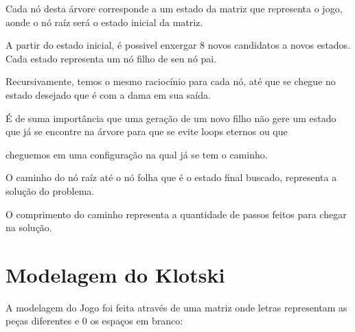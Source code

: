 \documentclass[letterpaper,10pt,openany,oneside,portuges]{sphinxmanual}
\begin{document}
\begin{DUlineblock}{0em}
\item[] 
\end{DUlineblock}
\begin{figure}[htbp]
\centering

\noindent{}
\end{figure}

\begin{DUlineblock}{0em}
\item[] Cada nó desta árvore corresponde a um estado da matriz que representa o jogo, aonde o nó raíz será o estado inicial da matriz.
\item[] A partir do estado inicial, é possivel enxergar 8 novos candidatos a novos estados. Cada estado representa um nó filho de seu nó pai.
\item[] Recursivamente, temos o mesmo raciocínio para cada nó, até que se chegue no estado desejado que é com a dama em sua saída.
\item[] É de suma importância que uma geração de um novo filho não gere um estado que já se encontre na árvore para que se evite loops eternos ou que
\end{DUlineblock}

cheguemos em uma configuração na qual já se tem o caminho.

\begin{DUlineblock}{0em}
\item[] O caminho do nó raíz até o nó folha que é o estado final buscado, representa a solução do problema.
\end{DUlineblock}
\begin{figure}[htbp]
\centering

\noindent{}
\end{figure}

\begin{DUlineblock}{0em}
\item[] O comprimento do caminho representa a quantidade de passos feitos para chegar na solução.
\end{DUlineblock}


\section{Modelagem do Klotski}
\label{\detokenize{algoritmo:modelagem-do-klotski}}
\begin{DUlineblock}{0em}
\item[] A modelagem do Jogo foi feita através de uma matriz onde letras representam as peças diferentes e 0 os espaços em branco:
\end{DUlineblock}
\begin{figure}[htbp]
\centering

\noindent{}
\end{figure}
\end{document}
